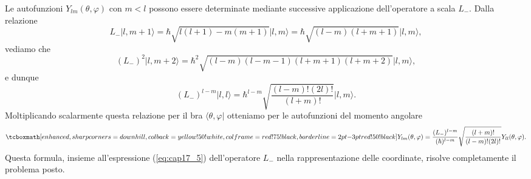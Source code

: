 \documentclass[a4paper,12pt,oneside]{book}
\begin{document}
Le autofunzioni $Y_{lm}(\theta , \varphi)$ con $m<l$ possono essere determinate mediante successive applicazione dell'operatore a scala $L_-$. Dalla relazione
	\begin{equation}
		L_-\vert l, m+1 \rangle = \hbar \sqrt{l(l+1) - m(m+1)} \vert l,m \rangle = \hbar \sqrt{(l-m)(l+m+1)} \vert l,m \rangle ,
	\end{equation}
vediamo che 
	\begin{equation}
	(L_-)^2 \vert l, m+2 \rangle = \hbar ^2 \sqrt{(l-m)(l-m-1)(l+m+1)(l+m+2)}\vert l,m \rangle ,
	\end{equation}
e dunque
	\begin{equation}
	(L_-)^{l-m} \vert l, l \rangle = \hbar ^{l-m} \sqrt{\frac{(l-m)!(2l)!}{(l+m)!}}\vert l,m \rangle .
	\end{equation}
Moltiplicando scalarmente questa relazione per il bra $\langle \theta , \varphi \vert $ otteniamo per le autofunzioni del momento angolare
	\begin{equation}
		\tcboxmath[enhanced, sharp corners=downhill, colback=yellow!50!white, colframe=red!75!black, borderline={2pt}{-3pt}{red!50!black}]{	Y_{lm} (\theta ,  \varphi ) = \frac{(L_-)^{l-m}}{(\hbar )^{l-m}}\sqrt{\frac{(l+m)!}{(l-m)!(2l)!}} Y_{ll} (\theta , \varphi) . 
		}
	\end{equation}
Questa formula, insieme all'espressione (\ref{eq:cap17_5}) dell'operatore $L_-$ nella rappresentazione delle coordinate, risolve completamente il problema posto.\\
\end{document}
